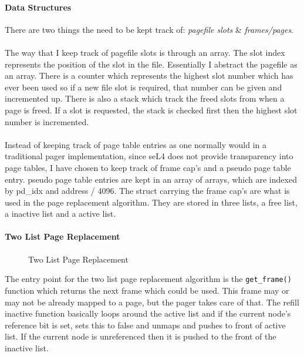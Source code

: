 \documentclass[../thesis.tex]{subfiles}
\begin{document}
\paragraph{Data Structures}
There are two things the need to be kept track of: \textit{pagefile slots} \& \textit{frames/pages}.\\\\
The way that I keep track of pagefile slots is through an array. The slot index represents the position of the slot in the file. Essentially I abstract the pagefile as an array. There is a counter which represents the highest slot number which has ever been used so if a new file slot is required, that number can be given and incremented up. There is also a stack which track the freed slots from when a page is freed. If a slot is requested, the stack is checked first then the highest slot number is incremented.
\\\\
Instead of keeping track of page table entries as one normally would in a traditional pager implementation, since seL4 does not provide transparency into page tables, I have chosen to keep track of frame \gls{cap}'s and a pseudo page table entry. pseudo page table entries are kept in an array of arrays, which are indexed by pd\_idx and address / 4096. The struct carrying the frame \gls{cap}'s are what is used in the page replacement algorithm. They are stored in three lists, a free list, a inactive list and a active list.

\paragraph{Two List Page Replacement}
\begin{figure}[H]
    \centering
    \resizebox{1.1\textwidth}{!}{
        
    
    }
    \caption{Two List Page Replacement}
    \label{Two List Page Replacement}
\end{figure}
The entry point for the two list page replacement algorithm is the \texttt{get\_frame()} function which returns the next frame which could be used. This frame may or may not be already mapped to a page, but the pager takes care of that. The refill inactive function basically loops around the active list and if the current node's reference bit is set, sets this to false and unmaps and pushes to front of active list. If the current node is unreferenced then it is pushed to the front of the inactive list.
\end{document}
